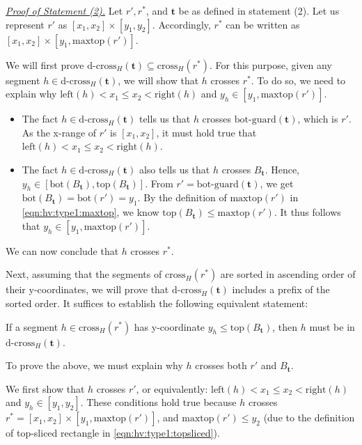 \documentclass[sigconf]{acmart}
\def\vgap{\vspace{0mm}}
\def\extraspacing{\vspace{1.5mm} \noindent}
\def\xleft{\mathrm{left}}
\def\xright{\mathrm{right}}
\def\ybot{\mathrm{bot}}
\def\ytop{\mathrm{top}}
\def\maxtop{\mathrm{maxtop}}
\def\gbot{\mathrm{bot\text{-}guard}}
\def\cross{\mathrm{cross}}
\def\dcross{\mathrm{d\text{-}cross}}
\begin{document}
{{{\extraspacing \underline{\em Proof of Statement (2).}
Let $r', r^*$, and $\bm{t}$ be as defined in statement (2). Let us represent $r'$ as $[x_1,x_2] \times [y_1, y_2]$. Accordingly, $r^*$ can be written as $[x_1, x_2] \times [y_1, \maxtop(r')]$.

\vgap

We will first prove $\dcross_H(\bm{t})\subseteq \cross_H(r^*)$. For this purpose, given any segment $h \in \dcross_H(\bm{t})$, we will show that $h$ crosses $r^*$. To do so, we need to explain why $\xleft(h) < x_1 \le x_2 < \xright(h)$ and $y_h \in [y_1, \maxtop(r')]$.
\begin{itemize}
    \item The fact $h \in \dcross_H(\bm{t})$ tells us that $h$ crosses $\gbot(\bm{t})$, which is $r'$. As the x-range of $r'$ is $[x_1,x_2]$, it must hold true that $\xleft(h) < x_1 \le x_2 < \xright(h)$.

    \vgap

    \item The fact $h \in \dcross_H(\bm{t})$ also tells us that $h$ crosses $B_{\bm{t}}$. Hence, $y_h \in [\ybot(B_\bm{t}), \ytop(B_{\bm{t}})]$. From $r' = \gbot(\bm{t})$, we get $\ybot(B_\bm{t}) = \ybot(r') = y_1$. By the definition of $\maxtop(r')$ in \eqref{eqn:hv:type1:maxtop}, we know $\ytop(B_{\bm{t}}) \leq \maxtop(r')$. It thus follows that $y_h \in [y_1, \maxtop(r')]$.
\end{itemize}
We can now conclude that $h$ crosses $r^*$.

\vgap

Next, assuming that the segments of $\cross_H(r^*)$ are sorted in ascending order of their y-coordinates,
we will prove that $\dcross_H(\bm{t})$ includes a prefix of the sorted order. It suffices to establish the following equivalent statement:

\vgap

 {
    If a segment $h \in \cross_H(r^*)$ has y-coordinate $y_h \le \ytop(B_{\bm{t}})$, then $h$ must be in $\dcross_H(\bm{t})$.
}

\vgap

\noindent To prove the above, we must explain why $h$ crosses both $r'$ and $B_{\bm{t}}$.

\vgap

We first show that $h$ crosses $r'$, or equivalently: $\xleft(h)  < x_1 \leq x_2 < \xright(h)$ and $y_h \in [y_1, y_2]$. These conditions hold true because $h$ crosses $r^* = [x_1,x_2]\times [y_1, \maxtop(r')]$, and $\maxtop(r')\leq y_2$ (due to the definition of top-sliced rectangle in \eqref{eqn:hv:type1:topsliced}).

}}}
\end{document}
